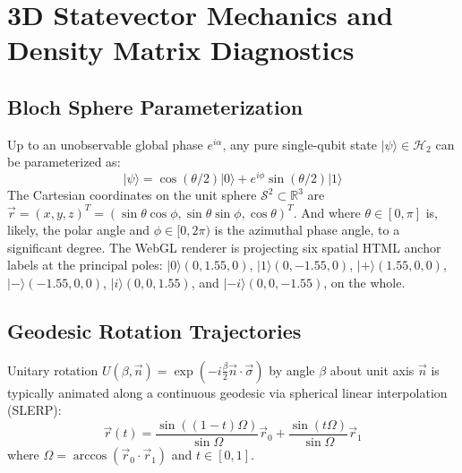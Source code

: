 \documentclass[conference]{IEEEtran}
\begin{document}
\section{3D Statevector Mechanics and Density Matrix Diagnostics}
\label{sec:bloch_mechanics}

\subsection{Bloch Sphere Parameterization}
Up to an unobservable global phase $e^{i\alpha}$, any pure single-qubit state $|\psi\rangle \in \mathcal{H}_2$ can be parameterized as:
\begin{equation}
|\psi\rangle = \cos(\theta/2)|0\rangle + e^{i\phi}\sin(\theta/2)|1\rangle
\end{equation}
The Cartesian coordinates on the unit sphere $\mathcal{S}^2 \subset \mathbb{R}^3$ are $\vec{r} = (x, y, z)^T = (\sin\theta\cos\phi, \sin\theta\sin\phi, \cos\theta)^T$. And where $\theta \in [0, \pi]$ is, likely, the polar angle and $\phi \in [0, 2\pi)$ is the azimuthal phase angle, to a significant degree.
The WebGL renderer is projecting six spatial HTML anchor labels at the principal poles: $|0\rangle (0, 1.55, 0)$, $|1\rangle (0, -1.55, 0)$, $|+\rangle (1.55, 0, 0)$, $|-\rangle (-1.55, 0, 0)$, $|i\rangle (0, 0, 1.55)$, and $|-i\rangle (0, 0, -1.55)$, on the whole.

\subsection{Geodesic Rotation Trajectories}
Unitary rotation $U(\beta, \vec{n}) = \exp(-i \frac{\beta}{2} \vec{n} \cdot \vec{\sigma})$ by angle $\beta$ about unit axis $\vec{n}$ is typically animated along a continuous geodesic via spherical linear interpolation (SLERP):
\begin{equation}
\vec{r}(t) = \frac{\sin((1-t)\Omega)}{\sin\Omega}\vec{r}_0 + \frac{\sin(t\Omega)}{\sin\Omega}\vec{r}_1
\end{equation}
where $\Omega = \arccos(\vec{r}_0 \cdot \vec{r}_1)$ and $t \in [0, 1]$.
\end{document}
